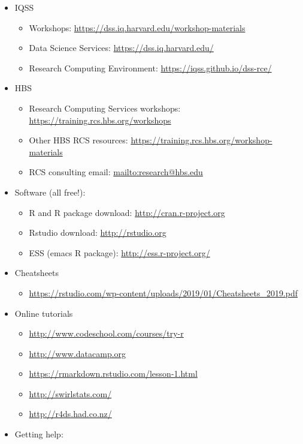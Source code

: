 \documentclass[]{book}
\providecommand{\tightlist}{%
  \setlength{\itemsep}{0pt}\setlength{\parskip}{0pt}}
\begin{document}
\begin{itemize}
\tightlist
\item
  IQSS

  \begin{itemize}
  \tightlist
  \item
    Workshops: \url{https://dss.iq.harvard.edu/workshop-materials}
  \item
    Data Science Services: \url{https://dss.iq.harvard.edu/}
  \item
    Research Computing Environment:
    \url{https://iqss.github.io/dss-rce/}
  \end{itemize}
\item
  HBS

  \begin{itemize}
  \tightlist
  \item
    Research Computing Services workshops:
    \url{https://training.rcs.hbs.org/workshops}
  \item
    Other HBS RCS resources:
    \url{https://training.rcs.hbs.org/workshop-materials}
  \item
    RCS consulting email: \url{mailto:research@hbs.edu}
  \end{itemize}
\item
  Software (all free!):

  \begin{itemize}
  \tightlist
  \item
    R and R package download: \url{http://cran.r-project.org}
  \item
    Rstudio download: \url{http://rstudio.org}
  \item
    ESS (emacs R package): \url{http://ess.r-project.org/}
  \end{itemize}
\item
  Cheatsheets

  \begin{itemize}
  \tightlist
  \item
    \url{https://rstudio.com/wp-content/uploads/2019/01/Cheatsheets_2019.pdf}
  \end{itemize}
\item
  Online tutorials

  \begin{itemize}
  \tightlist
  \item
    \url{http://www.codeschool.com/courses/try-r}
  \item
    \url{http://www.datacamp.org}
  \item
    \url{https://rmarkdown.rstudio.com/lesson-1.html}
  \item
    \url{http://swirlstats.com/}
  \item
    \url{http://r4ds.had.co.nz/}
  \end{itemize}
\item
  Getting help:


\end{itemize}
\end{document}
